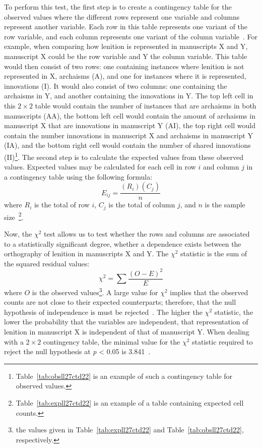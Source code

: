 To perform this test, the  first step is to create a contingency table for the observed values where the different rows represent one variable and columns represent another variable. Each row in this table represents one variant of the row variable, and each column represents one variant of the column variable~\autocite[754]{MS_Statistics09}.
For example, when comparing how lenition is represented in manuscripts X and Y, manuscript X could be the row variable and Y the column variable. This table would then consist of two rows: one containing instances where lenition is not represented in X, \ie archaisms (A), and one for instances where it is represented, \ie innovations (I).  It would also consist of two columns: one containing the archaisms in Y, and another containing the innovations in Y. The top left cell in this \(2 \times 2\) table would contain the number of instances that are archaisms in both manuscripts (AA), the bottom left cell would contain the amount of archaisms in manuscript X that are innovations in manuscript Y (AI), the top right cell would contain the number innovations in manuscript X and archaisms in manuscript Y (IA), and the bottom right cell would contain the number of shared innovations (II)\footnote{Table~\ref{tab:obsll27ctd22} is an example of such a contingency table for observed values.}.
The second step is to calculate the expected values from these observed values. Expected values may be calculated for each cell in row \(i\) and column \(j\) in a contingency table using the following formula:
\[E_{ij}=\frac{(R_i)(C_j)}{n}\]
where \(R_i\) is the total of row \(i\), \(C_j\) is the total of column \(j\), and \(n\) is the sample size~\autocite[755--756]{MS_Statistics09}\footnote{ Table~\ref{tab:expll27ctd22} is an example of a table containing expected cell counts.}.

Now, the \(\chi^2\) test allows us to test whether the rows and columns are associated to a statistically significant degree, \ie whether a dependence exists between the orthography of lenition in manuscripts X and Y. The \(\chi^2\) statistic is the sum of the squared residual values:
\[\chi^2=\sum{\frac{(O-E)^2}{E}}\]
where \(O\) is the observed values\footnote{\eg the values given in Table~\ref{tab:expll27ctd22} and Table~\ref{tab:obsll27ctd22}, respectively.}. A large value for \(\chi^2\) implies that the observed counts are not close to their expected counterparts; therefore, that the null hypothesis of independence is must be rejected~\autocite[756--757]{MS_Statistics09}. The higher the \(\chi^2\) statistic, the lower the probability that the variables are independent, \eg that representation of lenition in manuscript X is independent of that of manuscript Y. When dealing with a \(2 \times 2\) contingency table, the minimal value for the \(\chi^2\) statistic required to reject the null hypothesis at \textit{p} < 0.05 is 3.841~\autocite[798]{MS_Statistics09}.

